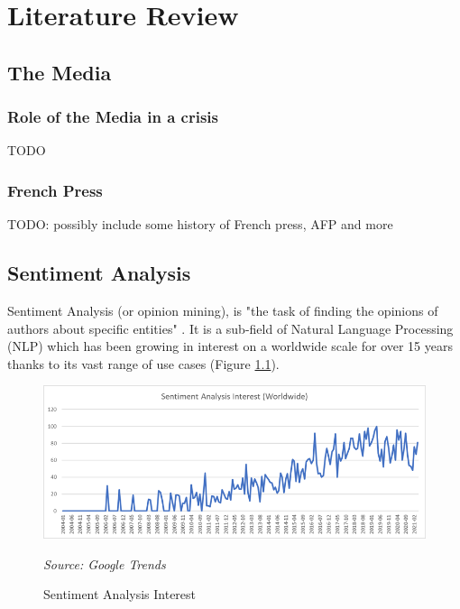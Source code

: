 \chapter{Literature Review}\label{Literature Review}

\section{The Media}

\subsection{Role of the Media in a crisis}\label{Role of the Media in a crisis}

TODO

\subsection{French Press}\label{chap:French Press}

TODO: possibly include some history of French press, AFP and more

\section{Sentiment Analysis}\label{Sentiment Analysis}

Sentiment Analysis (or opinion mining), is "the task of finding the opinions of authors about specific entities" \citep{feldman2013techniques}. It is a sub-field of Natural Language Processing (NLP) which has been growing in interest on a worldwide scale for over 15 years thanks to its vast range of use cases (Figure \ref{fig:sentiment interest}).

\begin{figure}[h!]
      \centering
      \includegraphics[scale=0.65]{lit_review/sentiment_analysis_interest.png}
      \caption{Sentiment Analysis Interest}
      \label{fig:sentiment interest}
      \emph{Source: Google Trends}
\end{figure}


